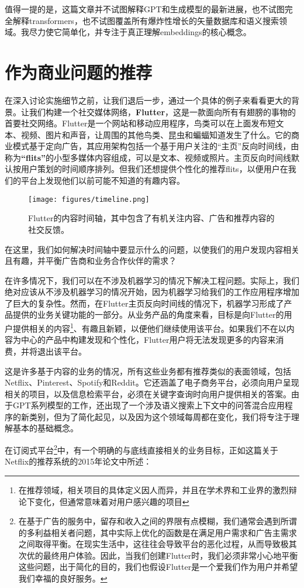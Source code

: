 \documentclass[Chinese, 11pt, table]{diazessay} %
\begin{document}
\begin{CJK}{UTF8}{gbsn}
\begin{sloppypar}
值得一提的是，这篇文章并不试图解释GPT和生成模型的最新进展，也不试图完全解释transformers，也不试图覆盖所有爆炸性增长的矢量数据库和语义搜索领域。我尽力使它简单化，并专注于真正理解embeddings的核心概念。


\section{作为商业问题的推荐}

在深入讨论实施细节之前，让我们退后一步，通过一个具体的例子来看看更大的背景。让我们构建一个社交媒体网络，\textbf{Flutter}，这是一款面向所有有翅膀的事物的首要社交网络。Flutter是一个网站和移动应用程序，鸟类可以在上面发布短文本、视频、图片和声音，让周围的其他鸟类、昆虫和蝙蝠知道发生了什么。它的商业模式基于定向广告，其应用架构包括一个基于用户关注的“主页”反向时间线，由称为\textbf{“flits”}的小型多媒体内容组成，可以是文本、视频或照片。主页反向时间线默认按用户策划的时间顺序排列。但我们还想提供个性化的推荐flits，以便用户在我们的平台上发现他们以前可能不知道的有趣内容。

\begin{figure}[H]
\centering
\texttt{[image: figures/timeline.png]}
\caption{Flutter的内容时间轴，其中包含了有机关注内容、广告和推荐内容的社交反馈。}
\end{figure}

在这里，我们如何解决时间轴中要显示什么的问题，以使我们的用户发现内容相关且有趣，并平衡广告商和业务合作伙伴的需求？

在许多情况下，我们可以在不涉及机器学习的情况下解决工程问题。实际上，我们绝对应该从不涉及机器学习的情况开始，因为机器学习给我们的工作应用程序增加了巨大的复杂性。然而，在Flutter主页反向时间线的情况下，机器学习形成了产品提供的业务关键功能的一部分。从业务产品的角度来看，目标是向Flutter的用户提供相关的内容\footnote{在推荐领域，相关项目的具体定义因人而异，并且在学术界和工业界的激烈辩论下变化，但通常意味着对用户感兴趣的项目}、有趣且新颖，以便他们继续使用该平台。如果我们不在以内容为中心的产品中构建发现和个性化，Flutter用户将无法发现更多的内容来消费，并将退出该平台。

这是许多基于内容的业务的情况，所有这些业务都有推荐类似的表面领域，包括Netflix、Pinterest、Spotify和Reddit。它还涵盖了电子商务平台，必须向用户呈现相关的项目，以及信息检索平台，必须在关键字查询时向用户提供相关的答案。由于GPT系列模型的工作，还出现了一个涉及语义搜索上下文中的问答混合应用程序的新类别，但为了简化起见，以及因为这个领域每周都在变化，我们将专注于理解基本的基础概念。

在订阅式平台\footnote{在基于广告的服务中，留存和收入之间的界限有点模糊，我们通常会遇到所谓的多利益相关者问题，其中实际上优化的函数是在满足用户需求和广告主需求之间取得平衡\citep{zheng2017multi}。在现实生活中，这往往会导致平台的恶化过程\citep{doctorow_2023}，从而导致极其次优的最终用户体验。因此，当我们创建Flutter时，我们必须非常小心地平衡这些问题，出于简化的目的，我们也假设Flutter是一个爱我们作为用户并希望我们幸福的良好服务。}中，有一个明确的与底线直接相关的业务目标，正如这篇关于Netflix的推荐系统的2015年论文中所述：


\end{sloppypar}
\end{CJK}
\end{document}
